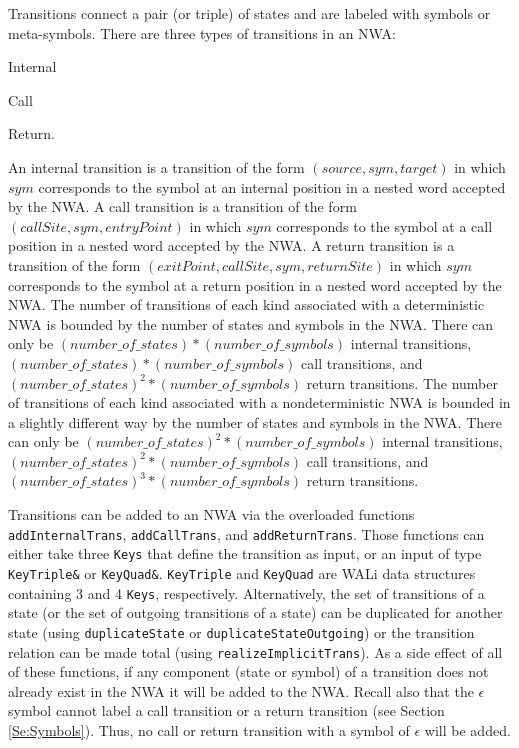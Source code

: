 Transitions connect a pair (or triple) of states and are labeled with symbols
or meta-symbols.  There are three types of transitions in an
NWA: \begin{inparaenum} \item Internal \item Call \item
  Return. \end{inparaenum} An internal transition is a transition of the form
$(source, sym, target)$ in which $sym$ corresponds to the symbol at an
internal position in a nested word accepted by the NWA.  A call transition is
a transition of the form $(callSite, sym, entryPoint)$ in which $sym$
corresponds to the symbol at a call position in a nested word accepted by the
NWA.  A return transition is a transition of the form $(exitPoint, callSite,
sym, returnSite)$ in which $sym$ corresponds to the symbol at a return
position in a nested word accepted by the NWA.  The number of transitions of
each kind associated with a deterministic NWA is bounded by the number of
states and symbols in the NWA.  There can only be
$(number\_of\_states)*(number\_of\_symbols)$ internal transitions,
$(number\_of\_states)*(number\_of\_symbols)$ call transitions, and
$(number\_of\_states)^2*(number\_of\_symbols)$ return transitions.  The
number of transitions of each kind associated with a nondeterministic NWA is
bounded in a slightly different way by the number of states and symbols in
the NWA.  There can only be $(number\_of\_states)^2*(number\_of\_symbols)$
internal transitions, $(number\_of\_states)^2*(number\_of\_symbols)$ call
transitions, and $(number\_of\_states)^3*(number\_of\_symbols)$ return
transitions.

Transitions can be added to an NWA via the overloaded functions
\texttt{addInternalTrans}, \texttt{addCallTrans}, and
\texttt{addReturnTrans}.  Those functions can either take three \texttt{Keys}
that define the transition as input, or an input of type \texttt{KeyTriple\&}
or \texttt{KeyQuad\&}.  \texttt{KeyTriple} and \texttt{KeyQuad} are WALi data
structures containing 3 and 4 \texttt{Keys}, respectively.  Alternatively,
the set of transitions of a state (or the set of outgoing transitions of a
state) can be duplicated for another state (using \texttt{duplicateState} or
\texttt{duplicateStateOutgoing}) or the transition relation can be made total (using
\texttt{realizeImplicitTrans}).  As a side effect of all of these functions,
if any component (state or symbol) of a transition does not already exist in
the NWA it will be added to the NWA. 
Recall also that the \texttt{$\epsilon$} symbol cannot label
a call transition or a return transition (see Section \ref{Se:Symbols}).
Thus, no call or return transition with a symbol of \texttt{$\epsilon$} will
be added. \\

